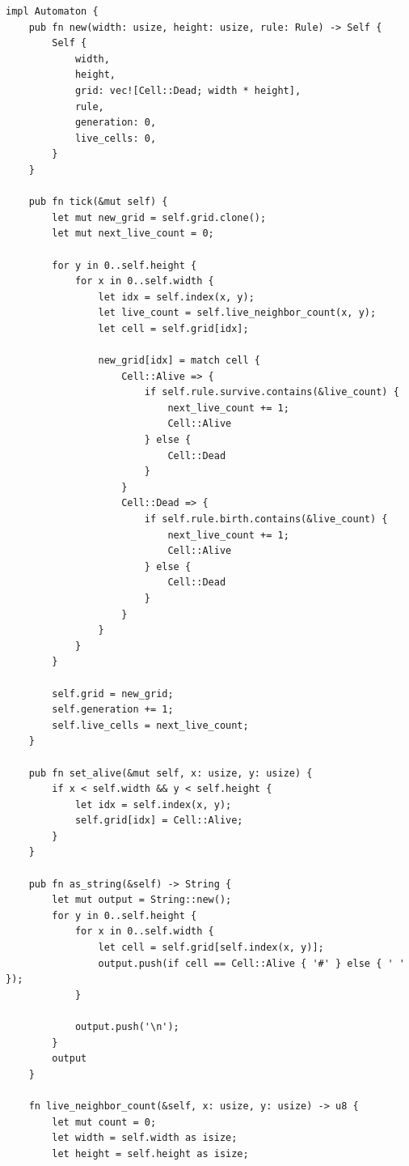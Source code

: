 \documentclass[12pt]{article}
\begin{document}
\begin{singlespace}

	\begin{verbatim}
impl Automaton {
    pub fn new(width: usize, height: usize, rule: Rule) -> Self {
        Self {
            width,
            height,
            grid: vec![Cell::Dead; width * height],
            rule,
            generation: 0,
            live_cells: 0,
        }
    }

    pub fn tick(&mut self) {
        let mut new_grid = self.grid.clone();
        let mut next_live_count = 0;

        for y in 0..self.height {
            for x in 0..self.width {
                let idx = self.index(x, y);
                let live_count = self.live_neighbor_count(x, y);
                let cell = self.grid[idx];

                new_grid[idx] = match cell {
                    Cell::Alive => {
                        if self.rule.survive.contains(&live_count) {
                            next_live_count += 1;
                            Cell::Alive
                        } else {
                            Cell::Dead
                        }
                    }
                    Cell::Dead => {
                        if self.rule.birth.contains(&live_count) {
                            next_live_count += 1;
                            Cell::Alive
                        } else {
                            Cell::Dead
                        }
                    }
                }
            }
        }

        self.grid = new_grid;
        self.generation += 1;
        self.live_cells = next_live_count;
    }

    pub fn set_alive(&mut self, x: usize, y: usize) {
        if x < self.width && y < self.height {
            let idx = self.index(x, y);
            self.grid[idx] = Cell::Alive;
        }
    }

    pub fn as_string(&self) -> String {
        let mut output = String::new();
        for y in 0..self.height {
            for x in 0..self.width {
                let cell = self.grid[self.index(x, y)];
                output.push(if cell == Cell::Alive { '#' } else { ' ' });
            }

            output.push('\n');
        }
        output
    }

    fn live_neighbor_count(&self, x: usize, y: usize) -> u8 {
        let mut count = 0;
        let width = self.width as isize;
        let height = self.height as isize;


\end{verbatim}
\end{singlespace}
\end{document}
